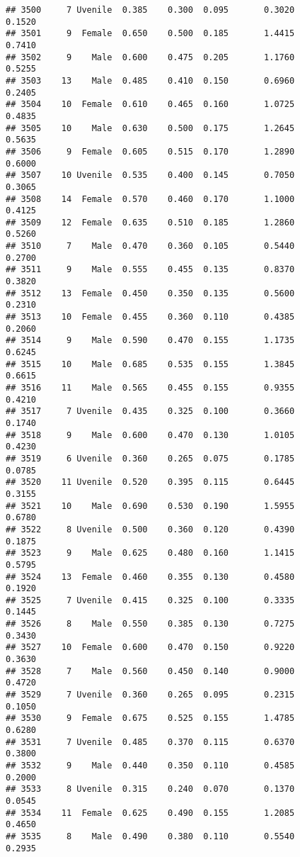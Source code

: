 \documentclass[
]{article}
\begin{document}
\begin{verbatim}
## 3500     7 Uvenile  0.385    0.300  0.095       0.3020         0.1520
## 3501     9  Female  0.650    0.500  0.185       1.4415         0.7410
## 3502     9    Male  0.600    0.475  0.205       1.1760         0.5255
## 3503    13    Male  0.485    0.410  0.150       0.6960         0.2405
## 3504    10  Female  0.610    0.465  0.160       1.0725         0.4835
## 3505    10    Male  0.630    0.500  0.175       1.2645         0.5635
## 3506     9  Female  0.605    0.515  0.170       1.2890         0.6000
## 3507    10 Uvenile  0.535    0.400  0.145       0.7050         0.3065
## 3508    14  Female  0.570    0.460  0.170       1.1000         0.4125
## 3509    12  Female  0.635    0.510  0.185       1.2860         0.5260
## 3510     7    Male  0.470    0.360  0.105       0.5440         0.2700
## 3511     9    Male  0.555    0.455  0.135       0.8370         0.3820
## 3512    13  Female  0.450    0.350  0.135       0.5600         0.2310
## 3513    10  Female  0.455    0.360  0.110       0.4385         0.2060
## 3514     9    Male  0.590    0.470  0.155       1.1735         0.6245
## 3515    10    Male  0.685    0.535  0.155       1.3845         0.6615
## 3516    11    Male  0.565    0.455  0.155       0.9355         0.4210
## 3517     7 Uvenile  0.435    0.325  0.100       0.3660         0.1740
## 3518     9    Male  0.600    0.470  0.130       1.0105         0.4230
## 3519     6 Uvenile  0.360    0.265  0.075       0.1785         0.0785
## 3520    11 Uvenile  0.520    0.395  0.115       0.6445         0.3155
## 3521    10    Male  0.690    0.530  0.190       1.5955         0.6780
## 3522     8 Uvenile  0.500    0.360  0.120       0.4390         0.1875
## 3523     9    Male  0.625    0.480  0.160       1.1415         0.5795
## 3524    13  Female  0.460    0.355  0.130       0.4580         0.1920
## 3525     7 Uvenile  0.415    0.325  0.100       0.3335         0.1445
## 3526     8    Male  0.550    0.385  0.130       0.7275         0.3430
## 3527    10  Female  0.600    0.470  0.150       0.9220         0.3630
## 3528     7    Male  0.560    0.450  0.140       0.9000         0.4720
## 3529     7 Uvenile  0.360    0.265  0.095       0.2315         0.1050
## 3530     9  Female  0.675    0.525  0.155       1.4785         0.6280
## 3531     7 Uvenile  0.485    0.370  0.115       0.6370         0.3800
## 3532     9    Male  0.440    0.350  0.110       0.4585         0.2000
## 3533     8 Uvenile  0.315    0.240  0.070       0.1370         0.0545
## 3534    11  Female  0.625    0.490  0.155       1.2085         0.4650
## 3535     8    Male  0.490    0.380  0.110       0.5540         0.2935

\end{verbatim}
\end{document}
